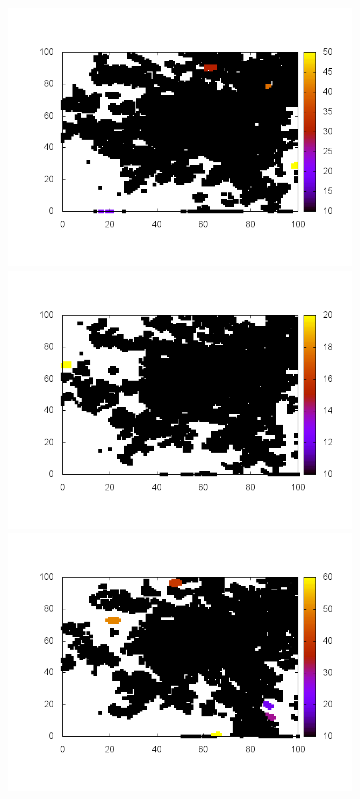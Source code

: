 \documentclass[10pt,a4paper]{article}
\begin{document}
\begin{figure}
\begin{subfigure}[b]{1\textwidth}
\end{subfigure}
\begin{subfigure}[b]{1\textwidth}
\includegraphics[scale=.3]{./img/stampe/scc1/15.png}
\includegraphics[scale=.3]{./img/stampe/scc1/16.png}
\includegraphics[scale=.3]{./img/stampe/scc1/17.png}

\end{subfigure}
\end{figure}
\end{document}
